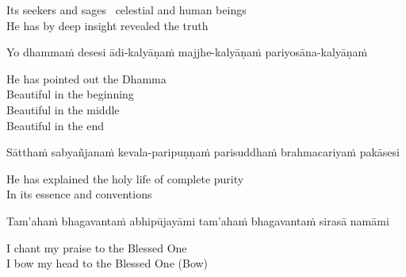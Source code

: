 \begin{english}
  Its seekers and sages \breathmark\ celestial and human beings\\
  He has by deep insight revealed the truth
\end{english}

\begin{pali-hang}
  Yo dhammaṁ desesi ādi-kalyāṇaṁ majjhe-kalyāṇaṁ pariyosāna-kalyāṇaṁ
\end{pali-hang}

\begin{english-verses}
  He has pointed out the Dhamma\\
  Beautiful in the beginning\\
  Beautiful in the middle\\
  Beautiful in the end\\
\end{english-verses}

\begin{pali-hang}
  Sātthaṁ sabyañjanaṁ kevala-paripuṇṇaṁ parisuddhaṁ brahmacariyaṁ pakāsesi
\end{pali-hang}

\begin{english}
  He has explained the holy life of complete purity\ifdigitalversion\makeatletter\hyperlink{endnote4-appendix}\makeatother\fi\\
  In its essence and conventions
\end{english}

\suttaRef{[SN 55.7]}

\begin{pali-hang}
  Tam'ahaṁ bhagavantaṁ abhipūjayāmi tam'ahaṁ bhagavantaṁ sirasā namāmi
\end{pali-hang}

\begin{english}
  I chant my praise to the Blessed One\\
  I bow my head to the Blessed One \hfill{\textnormal{\ifafiveversion\fontsize{12.5}{18}\fi\ifasixversion\fontsize{9}{13}\fi\selectfont (Bow)}}
\end{english}

\suttaRef{[Thai]}



